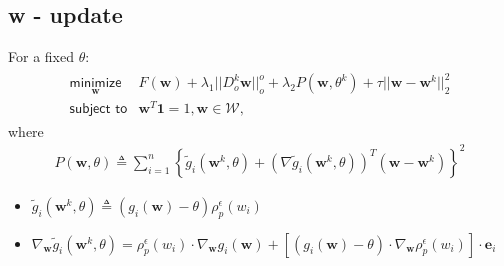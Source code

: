 \documentclass{article}
\begin{document}
\subsection{w - update}
For a fixed $\theta$:
\begin{align}\begin{array}{ll}
\underset{\bm{w}}{\textsf{minimize}} & F(\bm{w}) + \lambda_{1}||D^{k}_{o}\bm{w}||^{o}_{o} +
\lambda_{2}P(\bm{w}, \theta^{k}) + \tau ||\bm{w} - \bm{w}^{k}||^{2}_{2}\\
\textsf{subject to} & \bm{w}^{T}\bm{1} = 1, \bm{w} \in \mathcal{W},
\end{array}\end{align}
where
\begin{align}
P(\bm{w}, \theta) \triangleq \sum^{n}_{i=1}\left\{\tilde{g}_{i}(\bm{w}^{k}, \theta) +
                  (\nabla\tilde{g}_{i}(\bm{w}^{k}, \theta))^{T}(\bm{w} - \bm{w}^{k})\right\}^{2}
\end{align}
\begin{itemize}
\item $\tilde{g}_{i}(\bm{w}^{k}, \theta) \triangleq (g_i(\bm{w}) - \theta) \rho^{\epsilon}_{p}(w_{i})$
\item $\nabla_{\bm{w}}\tilde{g}_{i}(\bm{w}^{k}, \theta) = \rho^{\epsilon}_{p}(w_i)\cdot\nabla_{\bm{w}} g_{i}(\bm{w}) +
       \left[(g_{i}(\bm{w}) - \theta)\cdot\nabla_{\bm{w}}\rho^{\epsilon}_{p}(w_i)\right]\cdot \bm{e}_i$
\end{itemize}
\end{document}
